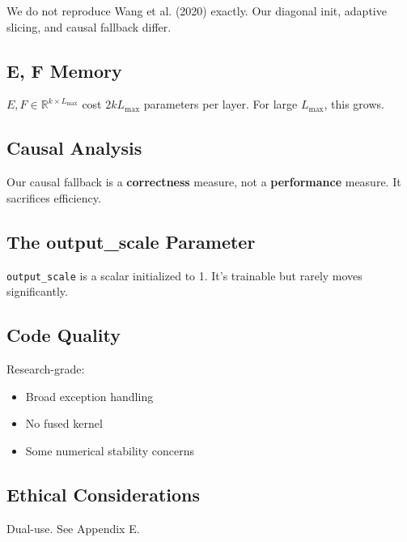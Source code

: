 We do not reproduce Wang et al. (2020) exactly. Our diagonal init, adaptive 
slicing, and causal fallback differ.

\subsection{E, F Memory}

$E, F \in \mathbb{R}^{k \times L_\text{max}}$ cost $2 k L_\text{max}$ 
parameters per layer. For large $L_\text{max}$, this grows.

\subsection{Causal Analysis}

Our causal fallback is a \textbf{correctness} measure, not a \textbf{performance} 
measure. It sacrifices efficiency.

\subsection{The output\_scale Parameter}

\texttt{output\_scale} is a scalar initialized to 1. It's trainable but rarely 
moves significantly.

\subsection{Code Quality}

Research-grade:
\begin{itemize}
\item Broad exception handling
\item No fused kernel
\item Some numerical stability concerns

\end{itemize}
\subsection{Ethical Considerations}

Dual-use. See Appendix E.

